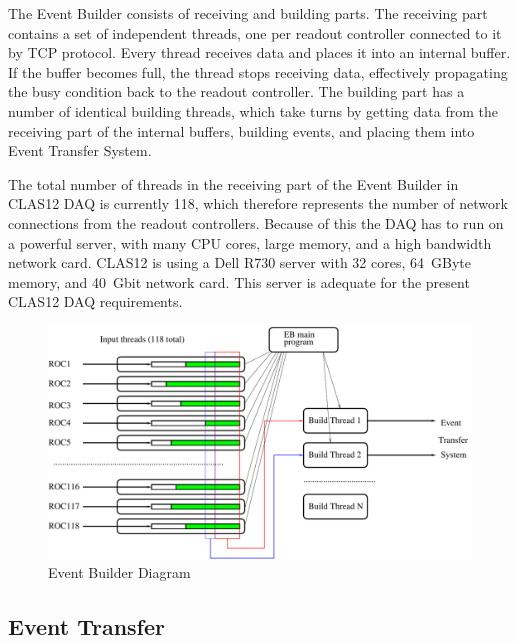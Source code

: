 The Event Builder consists of receiving and building parts. The receiving part contains a set of independent threads, one per readout controller connected to it by TCP protocol. Every thread receives data and places it into an internal buffer. If the buffer becomes full, the thread stops receiving data, effectively propagating the busy condition back to the readout controller. The building part has a number of identical building threads, which take turns by getting data from the receiving part of the internal buffers, building events, and placing them into Event Transfer System.

The total number of threads in the receiving part of the Event Builder in CLAS12 DAQ is currently 118, which therefore represents the number of network connections from the readout controllers. Because of this the DAQ has to run on a powerful server, with many CPU cores, large memory, and a high bandwidth network card. CLAS12 is using a Dell R730 server with 32 cores, 64~GByte memory, and 40~Gbit network card. This server is adequate for the present CLAS12 DAQ requirements.

\begin{figure}[hbt]
	\centering
	\includegraphics[width=1.0\columnwidth,keepaspectratio]{img/eb_diagram.pdf}
	\caption{Event Builder Diagram}
	\label{fig:eb_diagram}
\end{figure}


\subsection{Event Transfer}

